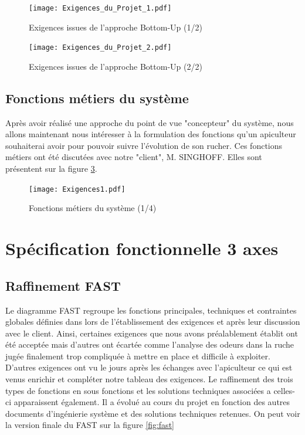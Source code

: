  
\begin{figure}[h!]
\centering\texttt{[image: Exigences\_du\_Projet\_1.pdf]}
\caption{\label{fig:exi1} Exigences issues de l'approche Bottom-Up (1/2)}
\end{figure}

 
\begin{figure}[h!]
\centering\texttt{[image: Exigences\_du\_Projet\_2.pdf]}
\caption{\label{fig:exi2} Exigences issues de l'approche Bottom-Up (2/2)}
\end{figure}

\clearpage

\section{Fonctions métiers du système}
\vspace{1.5cm}

Après avoir réalisé une approche du point de vue "concepteur" du système, nous allons maintenant nous intéresser à la formulation des fonctions qu'un apiculteur souhaiterai avoir pour pouvoir suivre l'évolution de son rucher. Ces fonctions métiers ont été discutées avec notre "client", M. SINGHOFF. Elles sont présentent sur la figure \ref{fig:exi1}.


\begin{figure}[h!]
\centering\texttt{[image: Exigences1.pdf]}
\caption{\label{fig:exi1} Fonctions métiers du système (1/4)}
\end{figure}


\chapter{Spécification fonctionnelle  3 axes}

\section{Raffinement FAST}
\vspace{1.5cm}
Le diagramme FAST regroupe les fonctions principales, techniques et contraintes globales définies dans lors de 
l'établissement des exigences et après leur discussion avec le client. Ainsi, certaines exigences que nous avons préalablement établit ont été acceptée mais d'autres ont écartée comme l'analyse des odeurs dans la ruche jugée finalement trop compliquée à mettre en place et difficile à exploiter. D'autres exigences ont vu le jours après les échanges avec l'apiculteur ce qui est venus enrichir et compléter notre tableau des exigences. Le raffinement des trois types de fonctions en sous fonctions et les solutions techniques 
associées a celles-ci apparaissent également. Il a évolué au cours du projet en fonction des autres documents 
d'ingénierie système et des solutions techniques retenues. 
On peut voir la version finale du FAST sur la figure \ref{fig:fast}

